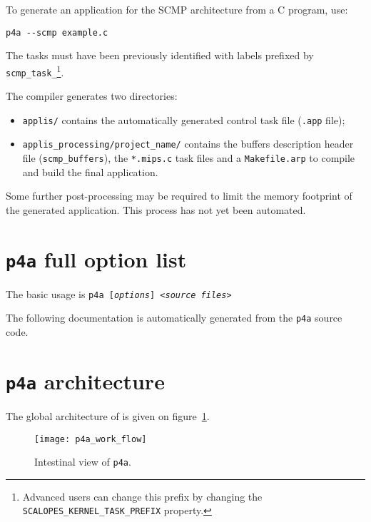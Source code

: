 \documentclass[a4paper]{article}
\begin{document}
To generate an application for the SCMP architecture from a C program, use:
\begin{verbatim}
p4a --scmp example.c
\end{verbatim}
The tasks must have been previously identified with labels prefixed by
\texttt{scmp\_task\_}\footnote{Advanced users can change this prefix
  by changing the \Apips \texttt{SCALOPES\_KERNEL\_TASK\_PREFIX}
  property.}.

The compiler generates two directories:
\begin{itemize}
\item \texttt{applis/}  contains the automatically generated control task file (\texttt{.app} file);
\item \texttt{applis\_processing/project\_name/} contains the buffers
  description header file (\texttt{scmp\_buffers}), the
  \texttt{*.mips.c} task files and a \texttt{Makefile.arp} to compile
  and build the final application.
\end{itemize}

Some further post-processing may be required to limit the memory
footprint of the generated application. This process has not yet been
automated.

\section{\protect\texttt{p4a} full option list}
\label{sec:options}

The basic usage is \texttt{p4a [\emph{options}] <\emph{source files}>}

The following documentation is automatically generated from the
\texttt{p4a} source code.




\section{\protect\texttt{p4a} architecture}
\label{sec:p4a-architecture}

The global architecture of \Apfa is given on
figure~\ref{fig:transit_intestinal}.

\begin{figure}
  \texttt{[image: p4a\_work\_flow]}
  \caption{Intestinal view of \texttt{p4a}.}
  \label{fig:transit_intestinal}
\end{figure}
\end{document}
